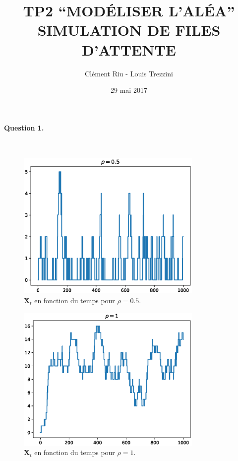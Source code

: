 \documentclass[12pt,a4paper]{article}
\title{\textbf{TP2 “MODÉLISER L’ALÉA” \\ SIMULATION DE FILES D'ATTENTE}}
\author{Clément Riu - Louis Trezzini}
\date{29 mai 2017}
\begin{document}
\maketitle

\paragraph*{Question 1.} ~\\

\begin{figure}[H]
	\centering
	\includegraphics[width=0.8\textwidth]{05.eps}
	\caption{$\mathbf{X}_t$ en fonction du temps pour $\rho = 0.5$.}
\end{figure}
\begin{figure}[H]
	\centering
	\includegraphics[width=0.8\textwidth]{10.eps}
	\caption{$\mathbf{X}_t$ en fonction du temps pour $\rho = 1$.}
\end{figure}
\end{document}
